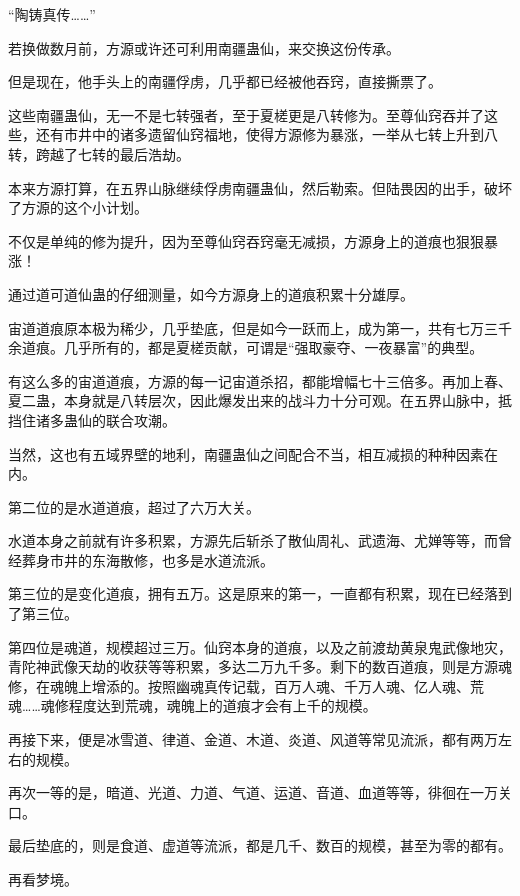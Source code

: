
\begin{this_body}

“陶铸真传……”

若换做数月前，方源或许还可利用南疆蛊仙，来交换这份传承。

但是现在，他手头上的南疆俘虏，几乎都已经被他吞窍，直接撕票了。

这些南疆蛊仙，无一不是七转强者，至于夏槎更是八转修为。至尊仙窍吞并了这些，还有市井中的诸多遗留仙窍福地，使得方源修为暴涨，一举从七转上升到八转，跨越了七转的最后浩劫。

本来方源打算，在五界山脉继续俘虏南疆蛊仙，然后勒索。但陆畏因的出手，破坏了方源的这个小计划。

不仅是单纯的修为提升，因为至尊仙窍吞窍毫无减损，方源身上的道痕也狠狠暴涨！

通过道可道仙蛊的仔细测量，如今方源身上的道痕积累十分雄厚。

宙道道痕原本极为稀少，几乎垫底，但是如今一跃而上，成为第一，共有七万三千余道痕。几乎所有的，都是夏槎贡献，可谓是“强取豪夺、一夜暴富”的典型。

有这么多的宙道道痕，方源的每一记宙道杀招，都能增幅七十三倍多。再加上春、夏二蛊，本身就是八转层次，因此爆发出来的战斗力十分可观。在五界山脉中，抵挡住诸多蛊仙的联合攻潮。

当然，这也有五域界壁的地利，南疆蛊仙之间配合不当，相互减损的种种因素在内。

第二位的是水道道痕，超过了六万大关。

水道本身之前就有许多积累，方源先后斩杀了散仙周礼、武遗海、尤婵等等，而曾经葬身市井的东海散修，也多是水道流派。

第三位的是变化道痕，拥有五万。这是原来的第一，一直都有积累，现在已经落到了第三位。

第四位是魂道，规模超过三万。仙窍本身的道痕，以及之前渡劫黄泉鬼武像地灾，青陀神武像天劫的收获等等积累，多达二万九千多。剩下的数百道痕，则是方源魂修，在魂魄上增添的。按照幽魂真传记载，百万人魂、千万人魂、亿人魂、荒魂……魂修程度达到荒魂，魂魄上的道痕才会有上千的规模。

再接下来，便是冰雪道、律道、金道、木道、炎道、风道等常见流派，都有两万左右的规模。

再次一等的是，暗道、光道、力道、气道、运道、音道、血道等等，徘徊在一万关口。

最后垫底的，则是食道、虚道等流派，都是几千、数百的规模，甚至为零的都有。

再看梦境。


\end{this_body}
